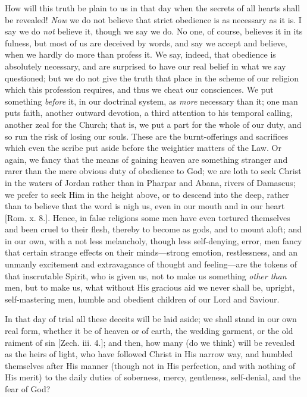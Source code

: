 How will this truth be plain to us in that day when the secrets of
all hearts shall be revealed! \emph{Now} we do not believe that strict
obedience is as necessary as it is. I say we do \emph{not} believe it,
though we say we do. No one, of course, believes it in its fulness,
but most of us are deceived by words, and say we accept and believe,
when we hardly do more than profess it. We say, indeed, that obedience
is absolutely necessary, and are surprised to have our real belief in
what we say questioned; but we do not give the truth that place in the
scheme of our religion which this profession requires, and thus we
cheat our consciences. We put something \emph{before} it, in our
doctrinal system, as \emph{more} necessary than it; one man puts
faith, another outward devotion, a third attention to his temporal
calling, another zeal for the Church; that is, we put a part for the
whole of our duty, and so run the risk of losing our souls. These are
the burnt-offerings and sacrifices which even the scribe put aside
before the weightier matters of the Law. Or again, we fancy that the
means of gaining heaven are something stranger and rarer than the mere
obvious duty of obedience to God; we are loth to seek Christ in the
waters of Jordan rather than in Pharpar and Abana, rivers of Damascus;
we prefer to seek Him in the height above, or to descend into the
deep, rather than to believe that the word is nigh us, even in our
mouth and in our heart [Rom. x. 8.]. Hence, in false religions some
men have even tortured themselves and been cruel to their flesh,
thereby to become as gods, and to mount aloft; and in our own, with a
not less melancholy, though less self-denying, error, men fancy that
certain strange effects on their minds—strong emotion, restlessness,
and an unmanly excitement and extravagance of thought and feeling—are
the tokens of that inscrutable Spirit, who is given us, not to make us
something \emph{other than} men, but to make us, what without His
gracious aid we never shall be, upright, self-mastering men, humble
and obedient children of our Lord and Saviour.

In that day of trial all these deceits will be laid aside; we shall
stand in our own real form, whether it be of heaven or of earth, the
wedding garment, or the old raiment of sin [Zech. iii. 4.]; and then,
how many (do we think) will be revealed as the heirs of light, who
have followed Christ in His narrow way, and humbled themselves after
His manner (though not in His perfection, and with nothing of His
merit) to the daily duties of soberness, mercy, gentleness,
self-denial, and the fear of God?

